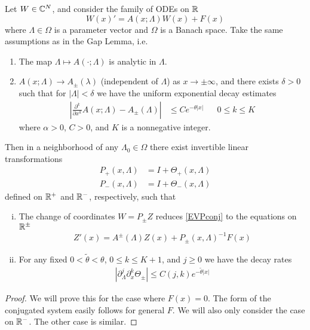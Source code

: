 \documentclass[thesis.tex]{subfiles}
\begin{document}
\begin{lemma}
Let $W \in {\mathbb C}^N$, and consider the family of ODEs on ${\mathbb R}$
\begin{equation}\label{EVPconj}
W(x)' = A(x; \Lambda) W(x) + F(x) 
\end{equation}
where $\Lambda \in \Omega$ is a parameter vector and $\Omega$ is a Banach space. Take the same assumptions as in the Gap Lemma, i.e. 
\begin{enumerate}
	\item The map $\Lambda \mapsto A(\cdot; \Lambda)$ is analytic in $\Lambda$.
	\item $A(x; \Lambda) \rightarrow A_\pm(\lambda)$ (independent of $\Lambda$) as $x \rightarrow \pm \infty$, and there exists $\delta > 0$ such that for $|\Lambda| < \delta$ we have the uniform exponential decay estimates 
	\begin{align}
	\left| \frac{\partial^k}{\partial x^k} A(x; \Lambda) - A_\pm(\Lambda) \right| 
	&\leq C e^{-\theta |x|} && 0 \leq k \leq K
	\end{align}
	where $\alpha > 0$, $C > 0$, and $K$ is a nonnegative integer.
\end{enumerate}
Then in a neighborhood of any $\Lambda_0 \in \Omega$ there exist invertible linear transformations
\begin{align*}
P_+(x, \Lambda) &= I + \Theta_+(x, \Lambda) \\
P_-(x, \Lambda) &= I + \Theta_-(x, \Lambda) 
\end{align*}
defined on ${\mathbb R}^+$ and ${\mathbb R}^-$, respectively, such that
\begin{enumerate}[(i)]
\item The change of coordinates $W = P_\pm Z$ reduces \eqref{EVPconj} to the equations on ${\mathbb R}^\pm$
\begin{align}\label{conjZ}
Z'(x) = A^\pm(\Lambda) Z(x) + P_\pm(x, \Lambda)^{-1} F(x)
\end{align}

\item For any fixed $0 < \tilde{\theta} < \theta$, $0 \leq k \leq K+1$, and $j \geq 0$ we have the decay rates
\begin{align*}
\left| \partial_\Lambda^j \partial_x^k \Theta_\pm \right| \leq C(j, k)e^{-\tilde{\theta}|x|}
\end{align*}
\end{enumerate}
\begin{proof}
We will prove this for the case where $F(x) = 0$. The form of the conjugated system easily follows for general $F$. We will also only consider the case on ${\mathbb R}^-$. The other case is similar. 


\end{proof}
\end{lemma}
\end{document}
